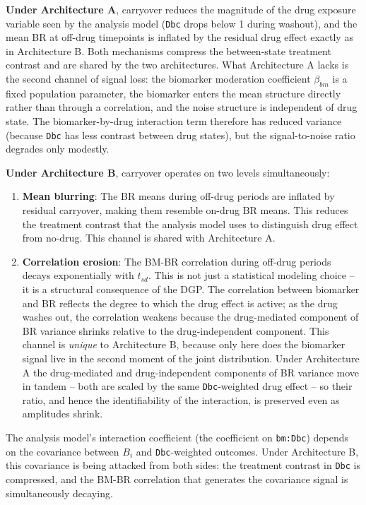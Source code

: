 \documentclass[
]{article}
\begin{document}
\textbf{Under Architecture A}, carryover reduces the magnitude
of the drug exposure variable seen by the analysis model
(\texttt{Dbc} drops below 1 during washout), and the mean BR at
off-drug timepoints is inflated by the residual drug effect
exactly as in Architecture B. Both mechanisms compress the
between-state treatment contrast and are shared by the two
architectures. What Architecture A lacks is the second channel
of signal loss: the biomarker moderation coefficient
\(\beta_{bm}\) is a fixed population parameter, the biomarker
enters the mean structure directly rather than through a
correlation, and the noise structure is independent of drug
state. The biomarker-by-drug interaction term therefore has
reduced variance (because \texttt{Dbc} has less contrast between
drug states), but the signal-to-noise ratio degrades only
modestly.

\textbf{Under Architecture B}, carryover operates on two levels
simultaneously:

\begin{enumerate}
\item \textbf{Mean blurring}: The BR means during off-drug periods are
  inflated by residual carryover, making them resemble on-drug
  BR means. This reduces the treatment contrast that the analysis
  model uses to distinguish drug effect from no-drug. This channel
  is shared with Architecture A.

\item \textbf{Correlation erosion}: The BM-BR correlation during off-drug
  periods decays exponentially with $t_{sd}$. This is not just a
  statistical modeling choice -- it is a structural consequence
  of the DGP. The correlation between biomarker and BR reflects
  the degree to which the drug effect is active; as the drug
  washes out, the correlation weakens because the drug-mediated
  component of BR variance shrinks relative to the
  drug-independent component. This channel is \emph{unique} to
  Architecture B, because only here does the biomarker signal
  live in the second moment of the joint distribution. Under
  Architecture A the drug-mediated and drug-independent
  components of BR variance move in tandem -- both are scaled by
  the same \texttt{Dbc}-weighted drug effect -- so their ratio,
  and hence the identifiability of the interaction, is preserved
  even as amplitudes shrink.
\end{enumerate}

The analysis model's interaction coefficient (the coefficient
on \texttt{bm:Dbc}) depends on the covariance between \(B_i\) and
\texttt{Dbc}-weighted outcomes. Under Architecture B, this
covariance is being attacked from both sides: the treatment
contrast in \texttt{Dbc} is compressed, and the BM-BR
correlation that generates the covariance signal is
simultaneously decaying.
\end{document}
